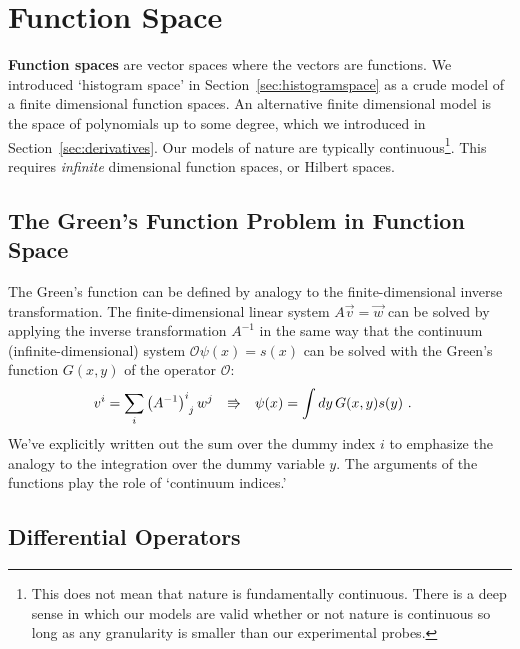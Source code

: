 
\section{Function Space}

\textbf{Function spaces} are vector spaces where the vectors are functions. We introduced `histogram space' in Section~\ref{sec:histogramspace} as a crude model of a finite dimensional function spaces. An alternative finite dimensional model is the space of polynomials up to some degree, which we introduced in Section~\ref{sec:derivatives}. Our models of nature are typically continuous\footnote{This does not mean that nature is fundamentally continuous. There is a deep sense in which our models are valid whether or not nature is continuous so long as any granularity is smaller than our experimental probes.}. This requires \emph{infinite} dimensional function spaces, or Hilbert spaces.

\subsection{The Green's Function Problem in Function Space}

The Green's function can be defined by analogy to the finite-dimensional inverse transformation. The finite-dimensional linear system $A\vec v = \vec w$ can be solved by applying the inverse transformation $A^{-1}$ in the same way that the continuum (infinite-dimensional) system $\mathcal O \psi(x) = s(x)$ can be solved with the Green's function $G(x,y)$ of the operator $\mathcal O$:
\begin{align}
	v^i &= \sum_i \mat{\left(A^{-1}\right)}{i}{j} w^j
	&\Rrightarrow
	&
	&
	\psi(x) &= \int  dy\, G(x,y) s(y) \ .
	\label{eq:def:of:function:space:Greens:function}
\end{align}
We've explicitly written out the sum over the dummy index $i$ to emphasize the analogy to the integration over the dummy variable $y$. The arguments of the functions play the role of `continuum indices.'

\subsection{Differential Operators}

